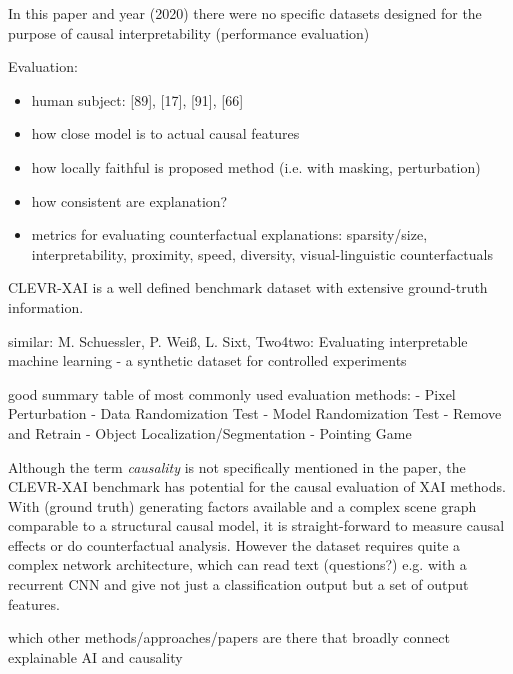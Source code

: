 {            In this paper and year (2020) there were no specific datasets designed for the purpose of causal interpretability (performance evaluation)

            Evaluation:

            \begin{itemize}
                  \item human subject: [89], [17], [91], [66]
                  \item how close model is to actual causal features
                  \item how locally faithful is proposed method (i.e. with masking, perturbation)
                  \item how consistent are explanation?
                  \item metrics for evaluating counterfactual explanations: sparsity/size, interpretability, proximity, speed, diversity, visual-linguistic counterfactuals
            \end{itemize}

            CLEVR-XAI \cite{Arras2022} is a well defined benchmark dataset with extensive ground-truth information.

            similar: M. Schuessler, P. Weiß, L. Sixt, Two4two: Evaluating interpretable machine learning - a synthetic dataset for controlled experiments

            good summary table of most commonly used evaluation methods:
            - Pixel Perturbation
            - Data Randomization Test
            - Model Randomization Test
            - Remove and Retrain
            - Object Localization/Segmentation
            - Pointing Game

            Although the term \textit{causality} is not specifically mentioned in the paper, the CLEVR-XAI benchmark has potential for the causal evaluation of XAI methods. With (ground truth) generating factors available and a complex scene graph comparable to a structural causal model, it is straight-forward to measure causal effects or do counterfactual analysis. However the dataset requires quite a complex network architecture, which can read text (questions?) e.g. with a recurrent CNN and give not just a classification output but a set of output features.
      }
      {\color{red} which other methods/approaches/papers are there that broadly connect explainable AI and causality }
